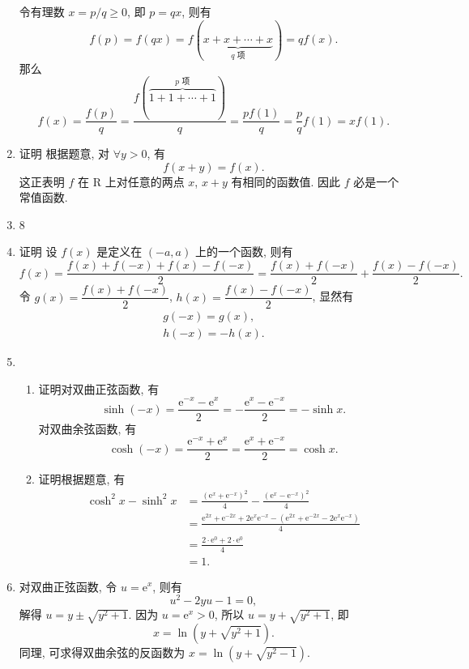 \begin{enumerate}
        令有理数 $x = p/q \geqslant 0$, 即 $p = qx$, 则有
        \[
            f(p) = f(qx) = f(\underbrace{x + x + \cdots + x}_{\text{$q$ 项}}) = qf(x).
        \]
        那么
        \[
            f(x) = \frac{f(p)}{q} = \frac{f(\overbrace{1 + 1 + \cdots + 1}^{\text{$p$ 项}})}{q} = \frac{pf(1)}{q} = \frac pq f(1) = xf(1).    
        \]
    \item %
        {\heiti 证明} 根据题意, 对 $\forall y > 0$, 有
        \[
            f(x + y) = f(x).    
        \]
        这正表明 $f$ 在 $\mathrm{R}$ 上对任意的两点 $x$, $x + y$ 有相同的函数值. 因此 $f$ 必是一个常值函数.  
    \item 8
    \item %
        {\heiti 证明} 设 $f(x)$ 是定义在 $(-a, a)$ 上的一个函数, 则有
        \[
            f(x) = \frac{f(x) + f(-x) + f(x) - f(-x)}{2} = \frac{f(x) + f(-x)}{2} + \frac{f(x) - f(-x)}{2}.    
        \]
        令 $g(x) = \dfrac{f(x) + f(-x)}{2}$, $h(x) = \dfrac{f(x) - f(-x)}{2}$, 显然有
        \begin{gather*}
            g(-x) = g(x), \\
            h(-x) = -h(x).
        \end{gather*}
    \item %
        \begin{enumerate}[(1)]
            \item %
                {\heiti 证明}\quad 对双曲正弦函数, 有
                \[
                    \sinh(-x) = \frac{\mathrm{e}^{-x} - \mathrm{e}^x}{2} = -\frac{\mathrm{e}^x - \mathrm{e}^{-x}}{2} = -\sinh x.    
                \]
                对双曲余弦函数, 有
                \[
                    \cosh(-x) = \frac{\mathrm{e}^{-x} + \mathrm{e}^x}{2} = \frac{\mathrm{e}^x + \mathrm{e}^{-x}}{2} = \cosh x.     
                \]
            \item %
                {\heiti 证明}\quad 根据题意, 有
                \begin{align*}
                    \cosh^2x - \sinh^2x &= \frac{(\mathrm{e}^x + \mathrm{e}^{-x})^2}{4} - \frac{(\mathrm{e}^x - \mathrm{e}^{-x})^2}{4} \\
                                        &= \frac{\mathrm{e}^{2x} + \mathrm{e}^{-2x} + 2\mathrm{e}^x\mathrm{e}^{-x} - (\mathrm{e}^{2x} + \mathrm{e}^{-2x} - 2\mathrm{e}^x\mathrm{e}^{-x})}{4} \\
                                        &= \frac{2 \cdot \mathrm{e}^0 + 2 \cdot \mathrm{e}^0}{4} \\
                                        &= 1.
                \end{align*}
        \end{enumerate}
    \item %
        对双曲正弦函数, 令 $u = \mathrm{e}^x$, 则有
        \[
            u^2 - 2yu - 1 = 0,    
        \]
        解得 $u = y \pm \sqrt{y^2 + 1}$. 因为 $u = \mathrm{e}^x > 0$, 所以 $u = y + \sqrt{y^2 + 1}$, 即
        \[
            x = \ln(y + \sqrt{y^2 + 1}).    
        \]
        同理, 可求得双曲余弦的反函数为 $x = \ln(y + \sqrt{y^2 - 1})$.
\end{enumerate}

% 